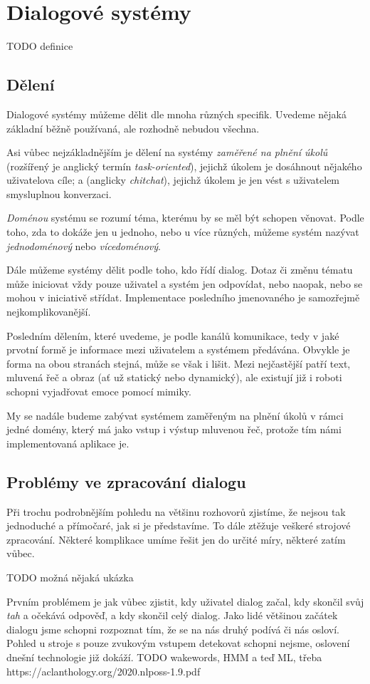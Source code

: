 
\chapter{Dialogové systémy}
TODO definice

\section{Dělení}
Dialogové systémy můžeme dělit dle mnoha různých specifik. Uvedeme nějaká
základní běžně používaná, ale rozhodně nebudou všechna.

Asi vůbec
nejzákladnějším je dělení na systémy \textit{zaměřené na plnění úkolů}
(rozšířený je anglický termín \textit{task-oriented}), jejichž úkolem
je dosáhnout nějakého uživatelova cíle; a  (anglicky
\textit{chitchat}), jejichž úkolem je jen vést s uživatelem smysluplnou
konverzaci.

\textit{Doménou} systému se rozumí téma, kterému by se měl být schopen
věnovat. Podle toho, zda to dokáže jen u jednoho, nebo u více různých,
můžeme systém nazývat \textit{jednodoménový} nebo \textit{vícedoménový}.

Dále můžeme systémy dělit podle toho, kdo řídí dialog. Dotaz či změnu tématu
může iniciovat vždy pouze uživatel a systém jen odpovídat, nebo naopak, nebo
se mohou v iniciativě střídat. Implementace posledního jmenovaného je samozřejmě
nejkomplikovanější.

Posledním dělením, které uvedeme, je podle kanálů komunikace, tedy
v jaké prvotní formě je informace mezi uživatelem a systémem předávána.
Obvykle je forma na obou stranách stejná, může se však i lišit. Mezi
nejčastější patří text, mluvená řeč a obraz (ať už statický nebo
dynamický), ale existují již i roboti schopni vyjadřovat emoce pomocí
mimiky.

My se nadále budeme zabývat systémem zaměřeným na plnění úkolů v rámci jedné
domény, který má jako vstup i výstup mluvenou řeč, protože tím námi
implementovaná aplikace je.

\section{Problémy ve zpracování dialogu}

Při trochu podrobnějším pohledu na většinu rozhovorů zjistíme, že nejsou
tak jednoduché a přímočaré, jak si je představíme. To dále ztěžuje
veškeré strojové zpracování. Některé komplikace umíme řešit jen do určité
míry, některé zatím vůbec.

TODO možná nějaká ukázka

Prvním problémem je jak vůbec zjistit, kdy uživatel dialog začal, kdy
skončil svůj \textit{tah} a očekává odpověď, a kdy skončil celý dialog.
Jako lidé většinou začátek dialogu jsme schopni rozpoznat tím, že se na
nás druhý podívá či nás osloví. Pohled u stroje s pouze zvukovým vstupem
detekovat schopni nejsme, oslovení dnešní technologie již dokáží. TODO
wakewords, HMM a teď ML, třeba https://aclanthology.org/2020.nlposs-1.9.pdf
